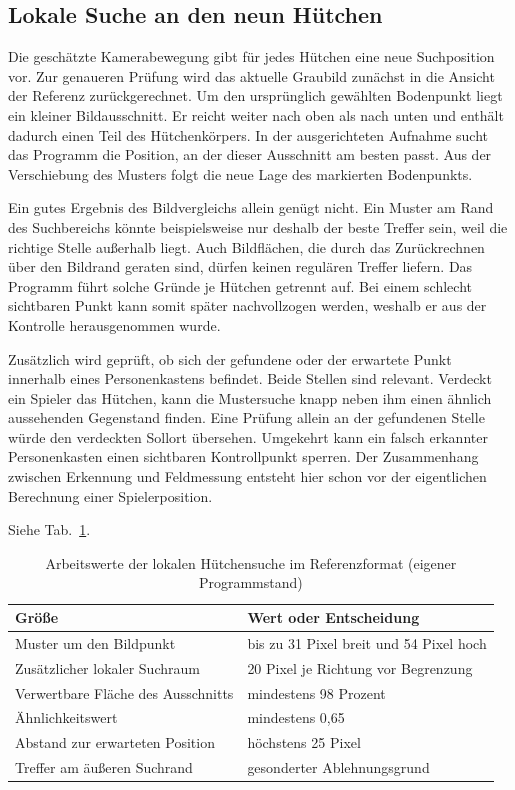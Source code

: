 \subsection{Lokale Suche an den neun Hütchen}
Die geschätzte Kamerabewegung gibt für jedes Hütchen eine neue Suchposition vor. Zur genaueren Prüfung wird das aktuelle Graubild zunächst in die Ansicht der Referenz zurückgerechnet. Um den ursprünglich gewählten Bodenpunkt liegt ein kleiner Bildausschnitt. Er reicht weiter nach oben als nach unten und enthält dadurch einen Teil des Hütchenkörpers. In der ausgerichteten Aufnahme sucht das Programm die Position, an der dieser Ausschnitt am besten passt. Aus der Verschiebung des Musters folgt die neue Lage des markierten Bodenpunkts.

Ein gutes Ergebnis des Bildvergleichs allein genügt nicht. Ein Muster am Rand des Suchbereichs könnte beispielsweise nur deshalb der beste Treffer sein, weil die richtige Stelle außerhalb liegt. Auch Bildflächen, die durch das Zurückrechnen über den Bildrand geraten sind, dürfen keinen regulären Treffer liefern. Das Programm führt solche Gründe je Hütchen getrennt auf. Bei einem schlecht sichtbaren Punkt kann somit später nachvollzogen werden, weshalb er aus der Kontrolle herausgenommen wurde.

Zusätzlich wird geprüft, ob sich der gefundene oder der erwartete Punkt innerhalb eines Personenkastens befindet. Beide Stellen sind relevant. Verdeckt ein Spieler das Hütchen, kann die Mustersuche knapp neben ihm einen ähnlich aussehenden Gegenstand finden. Eine Prüfung allein an der gefundenen Stelle würde den verdeckten Sollort übersehen. Umgekehrt kann ein falsch erkannter Personenkasten einen sichtbaren Kontrollpunkt sperren. Der Zusammenhang zwischen Erkennung und Feldmessung entsteht hier schon vor der eigentlichen Berechnung einer Spielerposition.

Siehe Tab.~\ref{tab:em-suche}.
\begin{table}[htbp]\centering\caption{Arbeitswerte der lokalen Hütchensuche im Referenzformat (eigener Programmstand)}\label{tab:em-suche}
\begin{tabular}{@{}ll@{}}\toprule Größe & Wert oder Entscheidung\\\midrule
Muster um den Bildpunkt & bis zu 31 Pixel breit und 54 Pixel hoch\\
Zusätzlicher lokaler Suchraum & 20 Pixel je Richtung vor Begrenzung\\
Verwertbare Fläche des Ausschnitts & mindestens 98 Prozent\\
Ähnlichkeitswert & mindestens 0,65\\
Abstand zur erwarteten Position & höchstens 25 Pixel\\
Treffer am äußeren Suchrand & gesonderter Ablehnungsgrund\\\bottomrule\end{tabular}\end{table}

